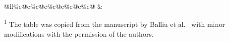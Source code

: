 \begin{table}
\begin{adjustbox}{center}
\begin{tabular}{@{}ll@{\hsp}c@{\hs}c@{\hs}c@{\hs}c@{\hsp}c@{\hs}c@{\hs}c@{\hs}c@{\hs}c@{\hsp}}
  &  \\
  \bottomrule
  \end{tabular}
  \end{adjustbox}
  \caption{An overview of the decidability of $\LCL$ problems on paths, cycles, and trees\textsuperscript{1}. The decidability is given assuming P $\ne$ PSPACE $\ne$ EXPTIME. Apart from the references given in the table for each of the columns,
  the works that contributed to the discovery of the presented knowledge include~\cite{Cole1986, Linial1992, Naor1991, Chang2016, BFHKLRSU16, Balliu2020-1, Balliu2016, Balliu2020-2}}
  \small{\textsuperscript{1} The table was copied from the manuscript
    by Balliu et al.~\cite{Balliu2021} with
    minor modifications with the permission of the authors.
  }
  \label{table:summary}
\end{table}
